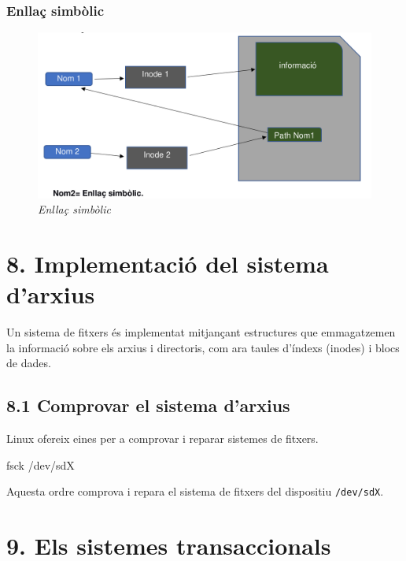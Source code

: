 \documentclass[
  12 pt,
  a4paper,
]{article}
\newenvironment{Shaded}{\begin{snugshade}}{\end{snugshade}}
\newcommand{\ExtensionTok}[1]{#1}
\newcommand{\NormalTok}[1]{#1}
\begin{document}
\subsubsection{Enllaç simbòlic}\label{enllauxe7-simbuxf2lic}

\begin{figure}
\centering
\includegraphics{png/enllaçSimbòlic.png}
\caption{\emph{Enllaç simbòlic}}
\end{figure}

\section{8. Implementació del sistema
d'arxius}\label{implementaciuxf3-del-sistema-darxius}

Un sistema de fitxers és implementat mitjançant estructures que
emmagatzemen la informació sobre els arxius i directoris, com ara taules
d'índexs (inodes) i blocs de dades.

\subsection{8.1 Comprovar el sistema
d'arxius}\label{comprovar-el-sistema-darxius}

Linux ofereix eines per a comprovar i reparar sistemes de fitxers.

\begin{Shaded}
\begin{Highlighting}[]
\ExtensionTok{fsck}\NormalTok{ /dev/sdX}
\end{Highlighting}
\end{Shaded}

Aquesta ordre comprova i repara el sistema de fitxers del dispositiu
\texttt{/dev/sdX}.

\section{9. Els sistemes
transaccionals}\label{els-sistemes-transaccionals}
\end{document}
